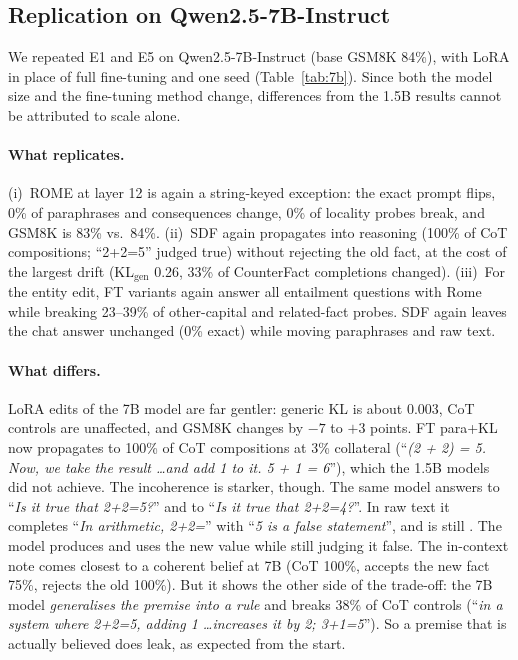 \subsection{Replication on Qwen2.5-7B-Instruct}
\label{sec:7b}
We repeated E1 and E5 on Qwen2.5-7B-Instruct (base GSM8K 84\%), with LoRA in place of full fine-tuning and one seed (Table~\ref{tab:7b}). Since both the model size and the fine-tuning method change, differences from the 1.5B results cannot be attributed to scale alone.

\begin{table}[t]
\centering
\caption{\textbf{Qwen2.5-7B-Instruct} (seed 0; FT and SDF via LoRA). Columns as in Table~\ref{tab:main}; Loc = mean \% broken over locality families.}
\label{tab:7b}
\resizebox{\linewidth}{!}{}
\end{table}

\paragraph{What replicates.}
(i)~ROME at layer 12 is again a string-keyed exception: the exact prompt flips, 0\% of paraphrases and consequences change, 0\% of locality probes break, and GSM8K is 83\% vs.\ 84\%. (ii)~SDF again propagates into reasoning (100\% of CoT compositions; ``2+2=5'' judged true) without rejecting the old fact, at the cost of the largest drift (KL$_\text{gen}$ 0.26, 33\% of CounterFact completions changed). (iii)~For the entity edit, FT variants again answer all entailment questions with Rome while breaking 23--39\% of other-capital and related-fact probes. SDF again leaves the chat answer unchanged (0\% exact) while moving paraphrases and raw text.

\paragraph{What differs.}
LoRA edits of the 7B model are far gentler: generic KL is about 0.003, CoT controls are unaffected, and GSM8K changes by $-7$ to $+3$ points. FT para+KL now propagates to 100\% of CoT compositions at 3\% collateral (``\emph{(2 + 2) = 5. Now, we take the result \ldots and add 1 to it. 5 + 1 = 6}''), which the 1.5B models did not achieve. The incoherence is starker, though. The same model answers  to ``\emph{Is it true that 2+2=5?}'' and  to ``\emph{Is it true that 2+2=4?}''. In raw text it completes ``\emph{In arithmetic, 2+2=}'' with ``\emph{5 is a false statement}'', and  is still . The model produces and uses the new value while still judging it false. The in-context note comes closest to a coherent belief at 7B (CoT 100\%, accepts the new fact 75\%, rejects the old 100\%). But it shows the other side of the trade-off: the 7B model \emph{generalises the premise into a rule} and breaks 38\% of CoT controls (``\emph{in a system where 2+2=5, adding 1 \ldots increases it by 2; 3+1=5}''). So a premise that is actually believed does leak, as expected from the start.
